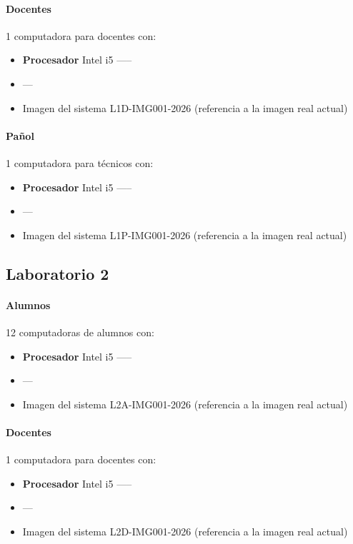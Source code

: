\paragraph{Docentes} 1 computadora para docentes con:
\begin{itemize}
    \item \textbf{Procesador} Intel i5 -----
    \item ---
    \item Imagen del sistema L1D-IMG001-2026 (referencia a la imagen real actual)
\end{itemize}

\paragraph{Pañol} 1 computadora para técnicos con:
\begin{itemize}
    \item \textbf{Procesador} Intel i5 -----
    \item ---
    \item Imagen del sistema L1P-IMG001-2026 (referencia a la imagen real actual)
\end{itemize}

\subsection{Laboratorio 2}
\paragraph{Alumnos} 12 computadoras de alumnos con:
\begin{itemize}
    \item \textbf{Procesador} Intel i5 -----
    \item ---
    \item Imagen del sistema L2A-IMG001-2026 (referencia a la imagen real actual)
\end{itemize}

\paragraph{Docentes} 1 computadora para docentes con:
\begin{itemize}
    \item \textbf{Procesador} Intel i5 -----
    \item ---
    \item Imagen del sistema L2D-IMG001-2026 (referencia a la imagen real actual)
\end{itemize}

